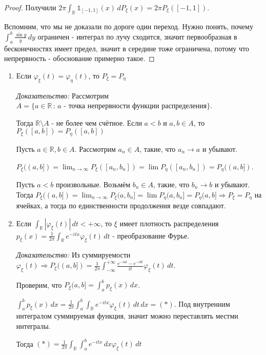 \begin{proof}
    Получили $2\pi \int_{\mathbb{R}} \mathds{1}_{[-1, 1]} (x) \, dP_{\xi} (x) = 2\pi P_{\xi}([-1, 1])$.

    Вспомним, что мы не доказали по дороге один переход. Нужно понять, почему $\int_{a}^b \frac{\sin y}{y} \, dy$ ограничен - интеграл по лучу сходится, значит первообразная 
    в бесконечностях имеет предел, значит в середине тоже ограничена, потому что непрервность - обоснование примерно такое. 

\end{proof}

\begin{consequence}
    \begin{enumerate}
        \item {
            Если $\varphi_{\xi}(t) = \varphi_{\eta}(t)$, то $P_{\xi} = P_\eta$

            \textit{Доказательство: } Рассмотрим $A = \{ a \in \mathbb{R} \, : \, \text{$a$ - точка непрервности функции распределения} \}$. 
            
            Тогда $\mathbb{R} \setminus A$ - не более чем счётное. 
            Если $a < b$ и $a, b \in A$, то $P_{\xi} ([a, b]) = P_\eta ([a, b])$

            Пусть $a \in \mathbb{R}, b \in A$. Рассмотрим $a_n \in A$, такие, что $a_n \to a$ и убывают.

            $P_{\xi} ((a, b]) = \lim_{n \to \infty} P_{\xi} ([a_n, b_n]) = \lim P_{\eta} ([a_n, b_n]) = P_\eta ((a, b])$.

            Пусть $a < b$ произвольные. Возьмём $b_n \in A$, такие, что $b_n \to b$ и убывают. Тогда $P_{\xi} ((a, b]) = \lim_{n \to \infty} P_{\xi} (a, b_n] = \lim P_\eta (a, b_n] = P_\eta (a, b] \Rightarrow 
            P_\xi = P_\eta$ на ячейках, а тогда по единственности продолжения везде совпадают.
        }

        \item {
            Если $\int_{\mathbb{R}} |\varphi_\xi (t) | \, dt < +\infty$, то $\xi$ имеет плотность распределения
            $p_{\xi} (x) = \frac{1}{2\pi} \int_{\mathbb{R}} e^{-itx} \varphi_{\xi} (t) \, dt$ - преобразование Фурье.

            \textit{Доказательство: } Из суммируемости $\varphi_\xi (t) \Rightarrow P_{\xi} ((a, b]) = \frac{1}{2\pi} \int_{-\infty}^{+\infty} \frac{e^{-iat} - e^{-ibt}}{it} \varphi_{\xi} (t) \, dt$. 

            Проверим, что $P_{\xi} (a, b] = \int_a^b p_{\xi} (x) \, dx$.

            $\int_a^b p_{\xi} (x) \, dx = \frac{1}{2\pi} \int_a^b \int_{\mathbb{R}} e^{-itx} \varphi_\xi (t) \, dt \, dx = (*)$. Под внутренним интегралом суммируемая функция, значит можно переставлять местми интегралы.

            Тогда $(*) = \frac{1}{2\pi} \int_{\mathbb{R}} \int_a^b e^{-itx} \, dx \varphi_\xi (t) \, dt$
        }
    \end{enumerate}
\end{consequence}

